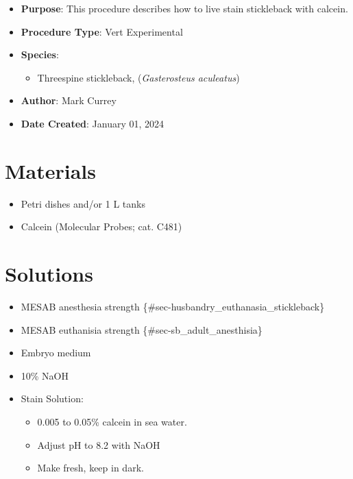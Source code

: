 \documentclass[
  letterpaper,
  DIV=11,
  numbers=noendperiod]{scrreprt}
\providecommand{\tightlist}{%
  \setlength{\itemsep}{0pt}\setlength{\parskip}{0pt}}\usepackage{longtable,booktabs,array}
\begin{document}
\begin{itemize}
\tightlist
\item
  \textbf{Purpose}: This procedure describes how to live stain
  stickleback with calcein.
\item
  \textbf{Procedure Type}: Vert Experimental
\item
  \textbf{Species}:

  \begin{itemize}
  \tightlist
  \item
    Threespine stickleback, (\emph{Gasterosteus aculeatus})
  \end{itemize}
\item
  \textbf{Author}: Mark Currey
\item
  \textbf{Date Created}: January 01, 2024
\end{itemize}

\hypertarget{materials-74}{%
\section{Materials}\label{materials-74}}

\begin{itemize}
\tightlist
\item
  Petri dishes and/or 1 L tanks
\item
  Calcein (Molecular Probes; cat. C481)
\end{itemize}

\hypertarget{solutions-66}{%
\section{Solutions}\label{solutions-66}}

\begin{itemize}
\tightlist
\item
  MESAB anesthesia strength \{\#sec-husbandry\_euthanasia\_stickleback\}
\item
  MESAB euthanisia strength \{\#sec-sb\_adult\_anesthisia\}
\item
  Embryo medium
\item
  10\% NaOH
\item
  Stain Solution:

  \begin{itemize}
  \tightlist
  \item
    0.005 to 0.05\% calcein in sea water.
  \item
    Adjust pH to 8.2 with NaOH
  \item
    Make fresh, keep in dark.
  \end{itemize}
\end{itemize}
\end{document}
